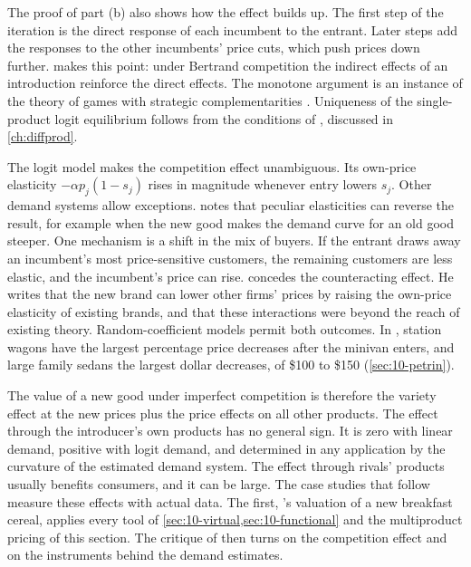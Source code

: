 The proof of part (b) also shows how the effect builds up. The first step of the iteration is the direct
response of each incumbent to the entrant. Later steps add the responses to the other incumbents' price cuts,
which push prices down further. \citet[p.~244, n.~13]{Bresnahan1997} makes this point: under Bertrand
competition the indirect effects of an introduction reinforce the direct effects. The monotone argument is an
instance of the theory of games with strategic complementarities \citep{MilgromRoberts1990}. Uniqueness of the
single-product logit equilibrium follows from the conditions of \citet{CaplinNalebuff1991}, discussed in
\cref{ch:diffprod}.

The logit model makes the competition effect unambiguous. Its own-price elasticity $-\alpha p_j(1 - s_j)$ rises
in magnitude whenever entry lowers $s_j$. Other demand systems allow exceptions. \citet[p.~243,
n.~12]{Bresnahan1997} notes that peculiar elasticities can reverse the result, for example when the new good
makes the demand curve for an old good steeper. One mechanism is a shift in the mix of buyers. If the entrant
draws away an incumbent's most price-sensitive customers, the remaining customers are less elastic, and the
incumbent's price can rise. \citet[p.~231, n.~32]{Hausman1997} concedes the counteracting effect. He writes
that the new brand can lower other firms' prices by raising the own-price elasticity of existing brands, and
that these interactions were beyond the reach of existing theory. Random-coefficient models permit both
outcomes. In \citet[p.~720]{Petrin2002}, station wagons have the largest percentage price decreases after the
minivan enters, and large family sedans the largest dollar decreases, of \$100 to \$150
(\cref{sec:10-petrin}).

The value of a new good under imperfect competition is therefore the variety effect at the new prices plus
the price effects on all other products. The effect through the introducer's own products has no general
sign. It is zero with linear demand, positive with logit demand, and determined in any application by the
curvature of the estimated demand system. The effect through rivals' products usually benefits consumers, and
it can be large. The case studies that follow measure these effects with actual data. The first,
\citeauthor{Hausman1997}'s valuation of a new breakfast cereal, applies every tool of
\cref{sec:10-virtual,sec:10-functional} and the multiproduct pricing of this section. The critique of
\citet{Bresnahan1997} then turns on the competition effect and on the instruments behind the demand estimates.

